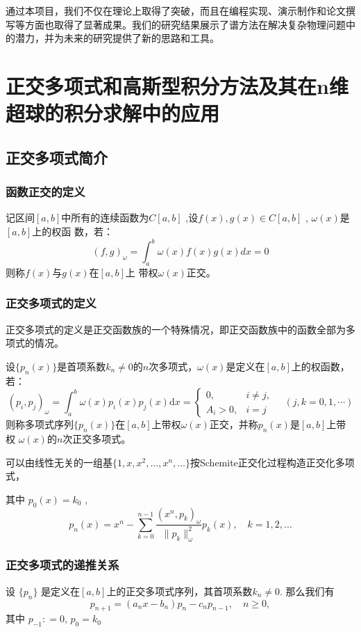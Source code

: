 \documentclass[12pt]{ctexart}
\numberwithin{equation}{section} %
\begin{document}
通过本项目，我们不仅在理论上取得了突破，而且在编程实现、演示制作和论文撰写等方面也取得了显著成果。我们的研究结果展示了谱方法在解决复杂物理问题中的潜力，并为未来的研究提供了新的思路和工具。
\section{正交多项式和高斯型积分方法及其在n维超球的积分求解中的应用 }
\subsection{正交多项式简介}
\subsubsection{函数正交的定义}
记区间$[a,b]$中所有的连续函数为$C[a,b]$ ,设$f(x),g(x)\in C[a,b]$ , $\omega(x)$是$[a,b]$上的权函
数，若：
\begin{equation}
    (f,g)_\omega=\int_a^b\omega(x)f(x)g(x)dx=0
\end{equation}
则称$f(x)$与$g(x)$在$[a,b]$上 带权$\omega(x)$正交。
\subsubsection{正交多项式的定义}
正交多项式的定义是正交函数族的一个特殊情况，即正交函数族中的函数全部为多项式的情况。

设$\{p_n(x)\}$是首项系数$k_n\neq0$的$n$次多项式，$\omega(x)$是定义在$[a,b]$上的权函数，若：
\begin{equation}
    (p_i,p_j)_\omega = \int_a^b \omega(x) p_i(x) p_j(x) \mathrm{d}x = 
    \begin{cases}
        0, & i \neq j, \\
        A_i > 0, & i = j
    \end{cases} \quad (j,k=0,1,\cdots)
\end{equation}
则称多项式序列$\{p_n(x)\}$在$[a,b]$上带权$\omega(x)$正交，并称$p_n(x)$是$[a,b]$上带权
$\omega(x)$的$n$次正交多项式。

可以由线性无关的一组基$\{1,x,x^2,\ldots,x^n,\ldots\}$按Schemite正交化过程构造正交化多项式，

其中
$p_0(x)=k_0\text{ ,}$
\begin{equation}
    p_n(x)=x^n-\sum_{k=0}^{n-1}\frac{(x^n,p_k)_\omega}{\|p_k\|_\omega^2}p_k(x),\quad k=1,2,\ldots 
\end{equation}
\subsubsection{正交多项式的递推关系}
设 $\{p_n\}$ 是定义在$[a,b]$上的正交多项式序列，其首项系数$k_{n}\neq 0.$ 
那么我们有
\begin{equation}
    p_{n+1}=(a_nx-b_n)p_n-c_np_{n-1},\quad n\geq0,
    \label{eq:正交多项式的递推关系}
\end{equation}
其中 $p_{- 1}: = 0$, $p_{0}= k_{0}$ 
\end{document}
